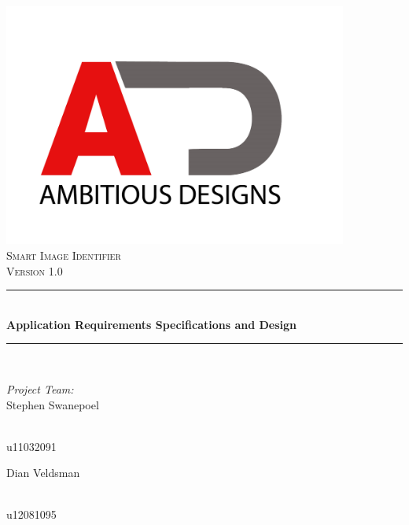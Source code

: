 \documentclass[a4paper,12pt]{report}
\newcommand{\HRule}{\rule{\linewidth}{0.5mm}}
\begin{document}
\begin{titlepage}
\begin{center}
\includegraphics[height=8cm]{../Images/ad.jpg}\\
\textsc{\Large Smart Image Identifier }\\[1.0cm]
\textsc{\Large Version 1.0 }\\[0.5cm]
\HRule \\[0.4cm]
{ \huge \bfseries  Application Requirements Specifications and Design}\\[0.4cm]
\HRule \\[0.4cm]
\begin{minipage}{0.4\textwidth}
\begin{flushleft} \large
\emph{Project Team:}\\
Stephen {Swanepoel}
\end{flushleft}
\end{minipage}
\begin{minipage}{0.4\textwidth}
\begin{flushright} \large
\emph{} \\
u11032091
\end{flushright}
\end{minipage}
\begin{minipage}{0.4\textwidth}
\begin{flushleft} \large
Dian {Veldsman}
\end{flushleft}
\end{minipage}
\begin{minipage}{0.4\textwidth}
\begin{flushright} \large
\emph{} \\
u12081095
\end{flushright}
\end{minipage}

\end{center}
\end{titlepage}
\footnotesize
\normalsize
\end{document}
